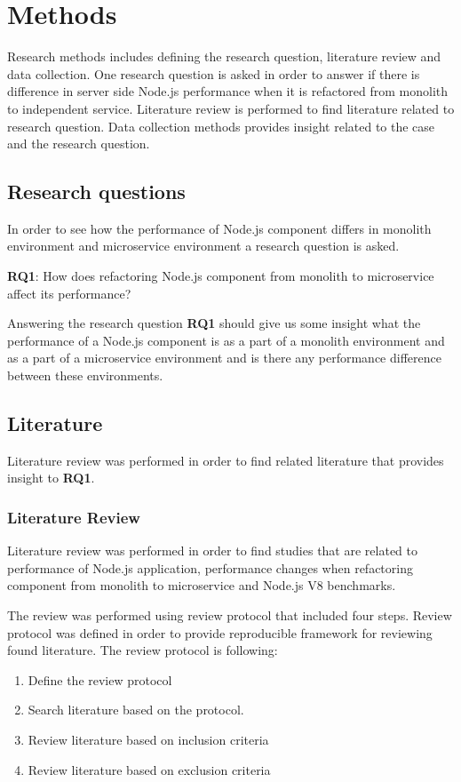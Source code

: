 \chapter{Methods\label{methods}}
Research methods includes defining the research question, literature review and data collection.
One research question is asked in order to answer if there is difference in server side Node.js performance when it is refactored from monolith to independent service.
Literature review is performed to find literature related to research question.
Data collection methods provides insight related to the case and the research question.

\section{Research questions}
In order to see how the performance of Node.js component differs in monolith environment and microservice environment a research question is asked.

\textbf{RQ1}: How does refactoring Node.js component from monolith to microservice affect its performance?

Answering the research question \textbf{RQ1} should give us some insight what the performance of a Node.js component is as a part of a monolith environment and as a part of a microservice environment and is there any performance difference between these environments.


\section{Literature}
Literature review was performed in order to find related literature that provides insight to \textbf{RQ1}.

\subsection{Literature Review}
Literature review was performed in order to find studies that are related to performance of Node.js application, performance changes when refactoring component from monolith to microservice and Node.js V8 benchmarks.

The review was performed using review protocol that included four steps.
Review protocol was defined in order to provide reproducible framework for reviewing found literature.
The review protocol is following:
\begin{enumerate}
    \item Define the review protocol
    \item Search literature based on the protocol.
    \item Review literature based on inclusion criteria
    \item Review literature based on exclusion criteria
\end{enumerate}

